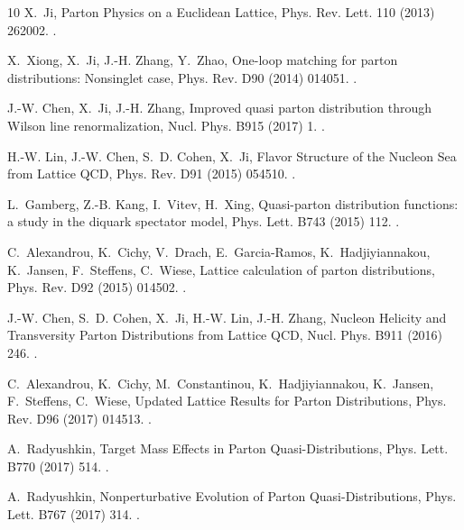 \begin{thebibliography}{10}
X.~Ji, {Parton Physics on a Euclidean Lattice}, Phys. Rev. Lett. 110 (2013)
  262002.
\newblock \href {http://arxiv.org/abs/1306.1539} {}.

X.~Xiong, X.~Ji, J.-H. Zhang, Y.~Zhao, {One-loop matching for parton
  distributions: Nonsinglet case}, Phys. Rev. D90 (2014) 014051.
\newblock \href {http://arxiv.org/abs/1310.7471} {}.

J.-W. Chen, X.~Ji, J.-H. Zhang, {Improved quasi parton distribution through
  Wilson line renormalization}, Nucl. Phys. B915 (2017) 1.
\newblock \href {http://arxiv.org/abs/1609.08102} {}.

H.-W. Lin, J.-W. Chen, S.~D. Cohen, X.~Ji, {Flavor Structure of the Nucleon Sea
  from Lattice QCD}, Phys. Rev. D91 (2015) 054510.
\newblock \href {http://arxiv.org/abs/1402.1462} {}.

L.~Gamberg, Z.-B. Kang, I.~Vitev, H.~Xing, {Quasi-parton distribution
  functions: a study in the diquark spectator model}, Phys. Lett. B743 (2015)
  112.
\newblock \href {http://arxiv.org/abs/1412.3401} {}.

C.~Alexandrou, K.~Cichy, V.~Drach, E.~Garcia-Ramos, K.~Hadjiyiannakou,
  K.~Jansen, F.~Steffens, C.~Wiese, {Lattice calculation of parton
  distributions}, Phys. Rev. D92 (2015) 014502.
\newblock \href {http://arxiv.org/abs/1504.07455} {}.

J.-W. Chen, S.~D. Cohen, X.~Ji, H.-W. Lin, J.-H. Zhang, {Nucleon Helicity and
  Transversity Parton Distributions from Lattice QCD}, Nucl. Phys. B911 (2016)
  246.
\newblock \href {http://arxiv.org/abs/1603.06664} {}.

C.~Alexandrou, K.~Cichy, M.~Constantinou, K.~Hadjiyiannakou, K.~Jansen,
  F.~Steffens, C.~Wiese, {Updated Lattice Results for Parton Distributions},
  Phys. Rev. D96 (2017) 014513.
\newblock \href {http://arxiv.org/abs/1610.03689} {}.

A.~Radyushkin, {Target Mass Effects in Parton Quasi-Distributions}, Phys. Lett.
  B770 (2017) 514.
\newblock \href {http://arxiv.org/abs/1702.01726} {}.

A.~Radyushkin, {Nonperturbative Evolution of Parton Quasi-Distributions}, Phys.
  Lett. B767 (2017) 314.
\newblock \href {http://arxiv.org/abs/1612.05170} {}.


\end{thebibliography}
